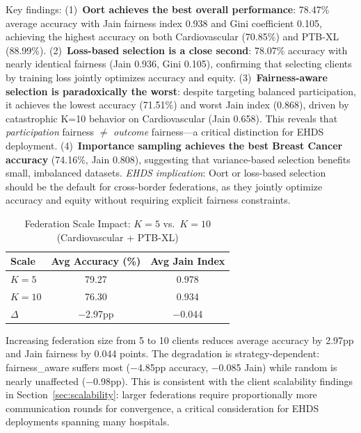 \documentclass[conference,a4paper]{IEEEtran}
\begin{document}
\begin{table}[htbp]
\vspace{1mm}
\footnotesize{Key findings: (1)~\textbf{Oort achieves the best overall performance}: 78.47\% average accuracy with Jain fairness index 0.938 and Gini coefficient 0.105, achieving the highest accuracy on both Cardiovascular (70.85\%) and PTB-XL (88.99\%). (2)~\textbf{Loss-based selection is a close second}: 78.07\% accuracy with nearly identical fairness (Jain 0.936, Gini 0.105), confirming that selecting clients by training loss jointly optimizes accuracy and equity. (3)~\textbf{Fairness-aware selection is paradoxically the worst}: despite targeting balanced participation, it achieves the lowest accuracy (71.51\%) and worst Jain index (0.868), driven by catastrophic K=10 behavior on Cardiovascular (Jain 0.658). This reveals that \textit{participation} fairness $\neq$ \textit{outcome} fairness---a critical distinction for EHDS deployment. (4)~\textbf{Importance sampling achieves the best Breast Cancer accuracy} (74.16\%, Jain 0.808), suggesting that variance-based selection benefits small, imbalanced datasets. \textit{EHDS implication}: Oort or loss-based selection should be the default for cross-border federations, as they jointly optimize accuracy and equity without requiring explicit fairness constraints.}
\end{table}

\begin{table}[htbp]
\centering
\caption{Federation Scale Impact: $K{=}5$ vs.\ $K{=}10$ (Cardiovascular + PTB-XL)}
\label{tab:scale_comparison}
\begin{tabular}{lcc}
\toprule
Scale & Avg Accuracy (\%) & Avg Jain Index \\
\midrule
$K{=}5$ & 79.27 & 0.978 \\
$K{=}10$ & 76.30 & 0.934 \\
\midrule
$\Delta$ & $-$2.97pp & $-$0.044 \\
\bottomrule
\end{tabular}

\vspace{1mm}
\footnotesize{Increasing federation size from 5 to 10 clients reduces average accuracy by 2.97pp and Jain fairness by 0.044 points. The degradation is strategy-dependent: fairness\_aware suffers most ($-$4.85pp accuracy, $-$0.085 Jain) while random is nearly unaffected ($-$0.98pp). This is consistent with the client scalability findings in Section~\ref{sec:scalability}: larger federations require proportionally more communication rounds for convergence, a critical consideration for EHDS deployments spanning many hospitals.}
\end{table}
\end{document}
